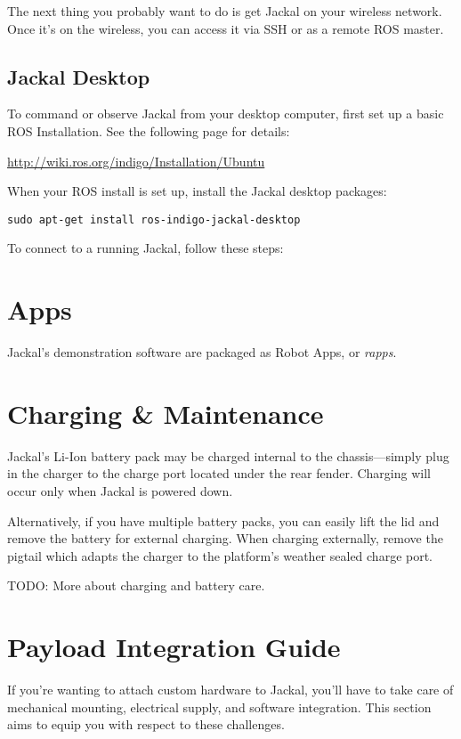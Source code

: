 \documentclass[]{clearpath-manual}
\begin{document}
The next thing you probably want to do is get Jackal on your wireless network. Once it's
on the wireless, you can access it via SSH or as a remote ROS master.


\subsection{Jackal Desktop}

To command or observe Jackal from your desktop computer, first set up a basic
ROS Installation. See the following page for details:

\url{http://wiki.ros.org/indigo/Installation/Ubuntu}

When your ROS install is set up, install the Jackal desktop packages:

\begin{lstlisting}
sudo apt-get install ros-indigo-jackal-desktop
\end{lstlisting}

To connect to a running Jackal, follow these steps:


\section{Apps}

Jackal's demonstration software are packaged as Robot Apps, or \textit{rapps}.


\section{Charging \& Maintenance}

Jackal's Li-Ion battery pack may be charged internal to the chassis---simply plug in
the charger to the charge port located under the rear fender. Charging will occur
only when Jackal is powered down.

Alternatively, if you have multiple battery packs, you can easily lift the lid and
remove the battery for external charging. When charging externally, remove the pigtail
which adapts the charger to the platform's weather sealed charge port.

TODO: More about charging and battery care.


\section{Payload Integration Guide}

If you're wanting to attach custom hardware to Jackal, you'll have to take care of
mechanical mounting, electrical supply, and software integration. This section
aims to equip you with respect to these challenges.
\end{document}
